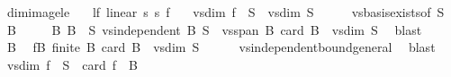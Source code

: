 \begin{isabellebody}
\isamarkupfalse%
%
\endisatagproof
{\isafoldproof}%
%
\isadelimproof
\isanewline
%
\endisadelimproof
\isanewline
{}\isamarkupfalse%
\ dim{\isacharunderscore}{\kern0pt}image{\isacharunderscore}{\kern0pt}le{\isacharcolon}{\kern0pt}\isanewline
\ \ \ lf{\isacharcolon}{\kern0pt}\ {\isachardoublequoteopen}linear\ s{}\ s{}\ f{\isachardoublequoteclose}\isanewline
\ \ \ {\isachardoublequoteopen}vs{}{\isachardot}{\kern0pt}dim\ {\isacharparenleft}{\kern0pt}f\ {\isacharbackquote}{\kern0pt}\ S{\isacharparenright}{\kern0pt}\ {\isasymle}\ vs{}{\isachardot}{\kern0pt}dim\ {\isacharparenleft}{\kern0pt}S{\isacharparenright}{\kern0pt}{\isachardoublequoteclose}\isanewline
%
\isadelimproof
%
\endisadelimproof
%
\isatagproof
{}\isamarkupfalse%
\ {\isacharminus}{\kern0pt}\isanewline
\ \ \isamarkupfalse%
\ vs{}{\isachardot}{\kern0pt}basis{\isacharunderscore}{\kern0pt}exists{\isacharbrackleft}{\kern0pt}of\ S{\isacharbrackright}{\kern0pt}\ \isamarkupfalse%
\ B\ \isanewline
\ \ \ \ B{\isacharcolon}{\kern0pt}\ {\isachardoublequoteopen}B\ {\isasymsubseteq}\ S{\isachardoublequoteclose}\ {\isachardoublequoteopen}vs{}{\isachardot}{\kern0pt}independent\ B{\isachardoublequoteclose}\ {\isachardoublequoteopen}S\ {\isasymsubseteq}\ vs{}{\isachardot}{\kern0pt}span\ B{\isachardoublequoteclose}\ {\isachardoublequoteopen}card\ B\ {\isacharequal}{\kern0pt}\ vs{}{\isachardot}{\kern0pt}dim\ S{\isachardoublequoteclose}\ \isamarkupfalse%
\ blast\isanewline
\ \ \isamarkupfalse%
\ B\ \isamarkupfalse%
\ fB{\isacharcolon}{\kern0pt}\ {\isachardoublequoteopen}finite\ B{\isachardoublequoteclose}\ {\isachardoublequoteopen}card\ B\ {\isacharequal}{\kern0pt}\ vs{}{\isachardot}{\kern0pt}dim\ S{\isachardoublequoteclose}\isanewline
\ \ \ \ \isamarkupfalse%
\ vs{}{\isachardot}{\kern0pt}independent{\isacharunderscore}{\kern0pt}bound{\isacharunderscore}{\kern0pt}general\ \isamarkupfalse%
\ blast{\isacharplus}{\kern0pt}\isanewline
\ \ \isamarkupfalse%
\ {\isachardoublequoteopen}vs{}{\isachardot}{\kern0pt}dim\ {\isacharparenleft}{\kern0pt}f\ {\isacharbackquote}{\kern0pt}\ S{\isacharparenright}{\kern0pt}\ {\isasymle}\ card\ {\isacharparenleft}{\kern0pt}f\ {\isacharbackquote}{\kern0pt}\ B{\isacharparenright}{\kern0pt}{\isachardoublequoteclose}\isanewline
\ \ \ \ \isamarkupfalse%

\end{isabellebody}
